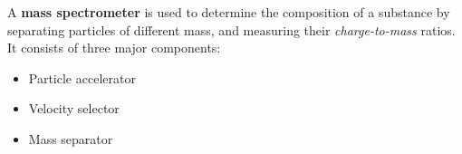 A \textbf{mass spectrometer} is used to determine the composition of a
substance by separating particles of different mass, and measuring their
\emph{charge-to-mass} ratios. It consists of three major components:
\begin{itemize}
\item Particle accelerator
\item Velocity selector
\item Mass separator
\end{itemize}
%      
%
%
%
%
